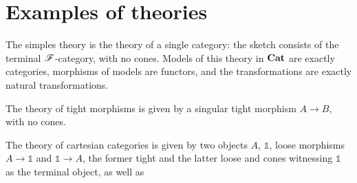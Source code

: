\documentclass[../thesis.tex]{subfiles}
\begin{document}
  \section{Examples of theories}
  \begin{example}
    The simples theory is the theory of a single category: the sketch consists of the terminal
    ${\mathscr{F}}$-category, with no cones. Models of this theory in ${\mathbf{Cat}}$ are exactly categories,
    morphisms of models are functors, and the transformations are exactly natural transformations.
  \end{example}

  \begin{example}
    The theory of tight morphisms is given by a singular tight morphism $A \to B$, with no cones.
  \end{example}
  
  \newcommand{\bone}{{\mathbb{1}}}
  \begin{example}
    The theory of cartesian categories is given by two objects $A$, $\bone$, loose morphisms $A
    \to \bone$ and $\bone \to A$, the former tight and the latter loose and cones witnessing
    $\bone$ as the terminal object, as well as 
  \end{example}

  \ifSubfilesClassLoaded{\printbibliography}{}
\end{document}
